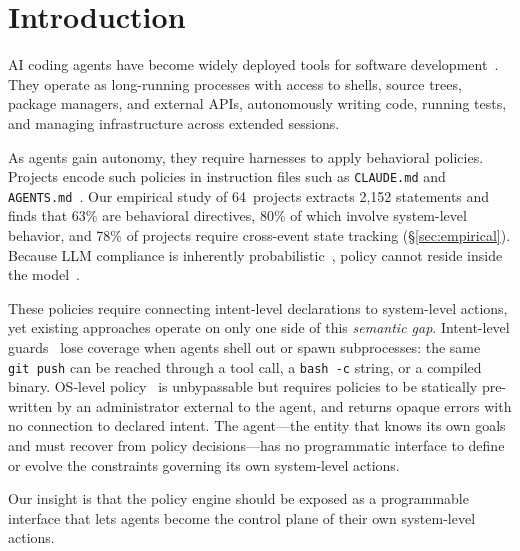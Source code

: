 \section{Introduction}


AI coding agents have become widely deployed tools for software
development~\cite{agentsight}. They operate as long-running processes with
access to shells, source trees, package managers, and external APIs,
autonomously writing code, running tests, and managing infrastructure across
extended sessions.

As agents gain autonomy, they require harnesses to apply behavioral
policies. Projects encode such policies in instruction files such
as \texttt{CLAUDE.md} and
\texttt{AGENTS.md}~\cite{chatlatanagulchai2025manifests,lulla2026agentsmd}.
Our empirical study of 64~projects extracts 2{,}152 statements and finds
that 63\% are behavioral directives, 80\% of which involve system-level
behavior, and 78\% of projects require cross-event state tracking
(\S\ref{sec:empirical}).
Because LLM compliance is inherently
probabilistic~\cite{liu2024lost}, policy cannot reside inside the
model~\cite{langchain-harness,fowler-harness}.

These policies require connecting intent-level declarations
to system-level actions, yet existing approaches operate on only one side
of this \emph{semantic gap}.
Intent-level guards~\cite{wang2025agentspec,shi2025progent} lose coverage
when agents shell out or spawn subprocesses:
the same \texttt{git~push} can be reached through a tool call, a
\texttt{bash~-c} string, or a compiled binary.
OS-level policy~\cite{ciliumtetragon,flume,pasquier2018camquery} is
unbypassable but requires policies to be statically pre-written
by an administrator external to the agent,
and returns opaque errors with no connection to declared intent.
The agent---the entity that knows its own goals and must recover from
policy decisions---has no programmatic interface to define or evolve
the constraints governing its own system-level actions.

Our insight is that the policy engine should be exposed as a
programmable interface that lets agents become the control plane of
their own system-level actions.

